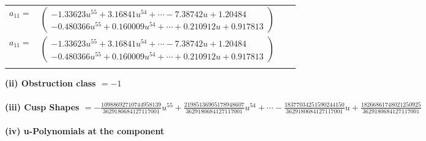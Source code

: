 \documentclass[1p]{elsarticle_modified}
\theoremstyle{definition}
\begin{document}
\begin{tabular}{m{7pt} m{180pt} m{7pt} m{180pt} }
\flushright $a_{11}=$&$\begin{pmatrix}-1.33623 u^{55}+3.16841 u^{54}+\cdots-7.38742 u+1.20484\\-0.480366 u^{55}+0.160009 u^{54}+\cdots+0.210912 u+0.917813\end{pmatrix}$\\ \flushright $a_{11}=$&$\begin{pmatrix}-1.33623 u^{55}+3.16841 u^{54}+\cdots-7.38742 u+1.20484\\-0.480366 u^{55}+0.160009 u^{54}+\cdots+0.210912 u+0.917813\end{pmatrix}$\\&\end{tabular}
\flushleft \textbf{(ii) Obstruction class $= -1$}\\~\\
\flushleft \textbf{(iii) Cusp Shapes $= -\frac{10988692710744958139}{3629180684127117001} u^{55}+\frac{21985136905178948607}{3629180684127117001} u^{54}+\cdots-\frac{18377034251590244150}{3629180684127117001} u+\frac{18266861748021250925}{3629180684127117001}$}\\~\\
\newpage\renewcommand{\arraystretch}{1}
\flushleft \textbf{(iv) u-Polynomials at the component}\newline \\
\end{document}
